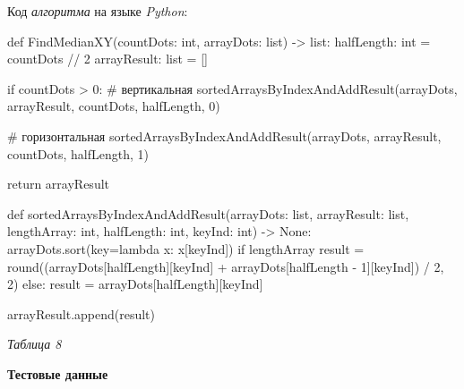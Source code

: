 \begin{enumerate}
\begin{item}
\begin{center}
		\end{center}
	\end{item}
	\newpage
	\begin{item}
		Код \textit{алгоритма} на языке \textit{Python}:
		\begin{mycode}
def FindMedianXY(countDots: int, arrayDots: list) -> list:
    halfLength: int = countDots // 2
    arrayResult: list = []

    if countDots > 0:
        # вертикальная
        sortedArraysByIndexAndAddResult(arrayDots, arrayResult, countDots,
                                        halfLength, 0)

        # горизонтальная
        sortedArraysByIndexAndAddResult(arrayDots, arrayResult, countDots,
                                        halfLength, 1)

    return arrayResult


def sortedArraysByIndexAndAddResult(arrayDots: list, arrayResult: list,
                                    lengthArray: int, halfLength: int,
                                    keyInd: int) -> None:
    arrayDots.sort(key=lambda x: x[keyInd])
    if lengthArray %
        result = round((arrayDots[halfLength][keyInd] +
                        arrayDots[halfLength - 1][keyInd]) / 2, 2)
    else:
        result = arrayDots[halfLength][keyInd]

    arrayResult.append(result)
		\end{mycode}
	\end{item}
	\newpage
	\begin{item}
		\hfill \textit{Таблица 8}

		\centering\textbf{Тестовые данные}


\end{item}
\end{enumerate}
